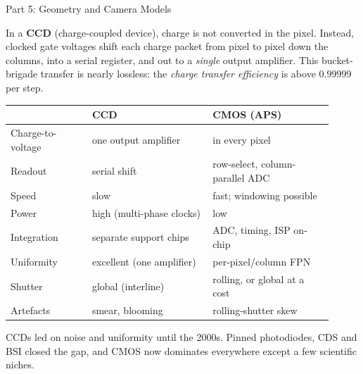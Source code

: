 \documentclass[letterpaper]{article}
\begin{document}
\begin{notes}{Part 5: Geometry and Camera Models}

In a \textbf{CCD} (charge-coupled device), charge is not converted in the pixel. Instead, clocked gate voltages shift each charge packet from pixel to pixel down the columns, into a serial register, and out to a \emph{single} output amplifier. This bucket-brigade transfer is nearly lossless: the \emph{charge transfer efficiency} is above $0.99999$ per step.

\begin{center}
\renewcommand{\arraystretch}{1.1}
\begin{tabular}{@{}p{0.23\linewidth}p{0.34\linewidth}p{0.34\linewidth}@{}}
\toprule
 & \textbf{CCD} & \textbf{CMOS (APS)} \\
\midrule
Charge-to-voltage & one output amplifier & in every pixel \\
Readout & serial shift & row-select, column-parallel ADC \\
Speed & slow & fast; windowing possible \\
Power & high (multi-phase clocks) & low \\
Integration & separate support chips & ADC, timing, ISP on-chip \\
Uniformity & excellent (one amplifier) & per-pixel/column FPN \\
Shutter & global (interline) & rolling, or global at a cost \\
Artefacts & smear, blooming & rolling-shutter skew \\
\bottomrule
\end{tabular}
\end{center}

CCDs led on noise and uniformity until the 2000s. Pinned photodiodes, CDS and BSI closed the gap, and CMOS now dominates everywhere except a few scientific niches.



\end{notes}
\end{document}
